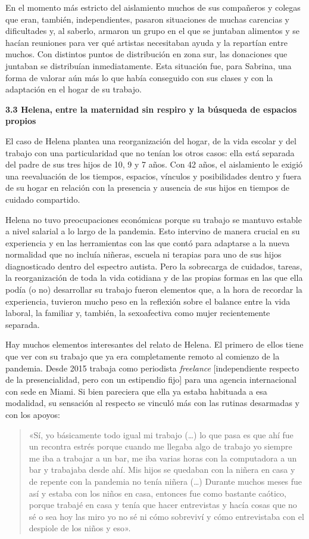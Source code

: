 En el momento más estricto del aislamiento muchos de sus compañeros y colegas que eran, también, independientes, pasaron situaciones de muchas carencias y dificultades y, al saberlo, armaron un grupo en el que se juntaban alimentos y se hacían reuniones para ver qué artistas necesitaban ayuda y la repartían entre muchos. Con distintos puntos de distribución en zona sur, las donaciones que juntaban se distribuían inmediatamente. Esta situación fue, para Sabrina, una forma de valorar aún más lo que había conseguido con sus clases y con la adaptación en el hogar de su trabajo.

\textbf{3.3 Helena, entre la maternidad sin respiro y la búsqueda de espacios propios}

El caso de Helena plantea una reorganización del hogar, de la vida escolar y del trabajo con una particularidad que no tenían los otros casos: ella está separada del padre de sus tres hijos de 10, 9 y 7 años. Con 42 años, el aislamiento le exigió una reevaluación de los tiempos, espacios, vínculos y posibilidades dentro y fuera de su hogar en relación con la presencia y ausencia de sus hijos en tiempos de cuidado compartido.

Helena no tuvo preocupaciones económicas porque su trabajo se mantuvo estable a nivel salarial a lo largo de la pandemia. Esto intervino de manera crucial en su experiencia y en las herramientas con las que contó para adaptarse a la nueva normalidad que no incluía niñeras, escuela ni terapias para uno de sus hijos diagnosticado dentro del espectro autista. Pero la sobrecarga de cuidados, tareas, la reorganización de toda la vida cotidiana y de las propias formas en las que ella podía (o no) desarrollar su trabajo fueron elementos que, a la hora de recordar la experiencia, tuvieron mucho peso en la reflexión sobre el balance entre la vida laboral, la familiar y, también, la sexoafectiva como mujer recientemente separada.

Hay muchos elementos interesantes del relato de Helena. El primero de ellos tiene que ver con su trabajo que ya era completamente remoto al comienzo de la pandemia. Desde 2015 trabaja como periodista \emph{freelance} {[}independiente respecto de la presencialidad, pero con un estipendio fijo{]} para una agencia internacional con sede en Miami. Si bien pareciera que ella ya estaba habituada a esa modalidad, su sensación al respecto se vinculó más con las rutinas desarmadas y con los apoyos:

\begin{quote}
«Sí, yo básicamente todo igual mi trabajo (\ldots) lo que pasa es que ahí fue un recontra estrés porque cuando me llegaba algo de trabajo yo siempre me iba a trabajar a un bar, me iba varias horas con la computadora a un bar y trabajaba desde ahí. Mis hijos se quedaban con la niñera en casa y de repente con la pandemia no tenía niñera (\ldots) Durante muchos meses fue así y estaba con los niños en casa, entonces fue como bastante caótico, porque trabajé en casa y tenía que hacer entrevistas y hacía cosas que no sé o sea hoy las miro yo no sé ni cómo sobreviví y cómo entrevistaba con el despiole de los niños y eso».
\end{quote}

